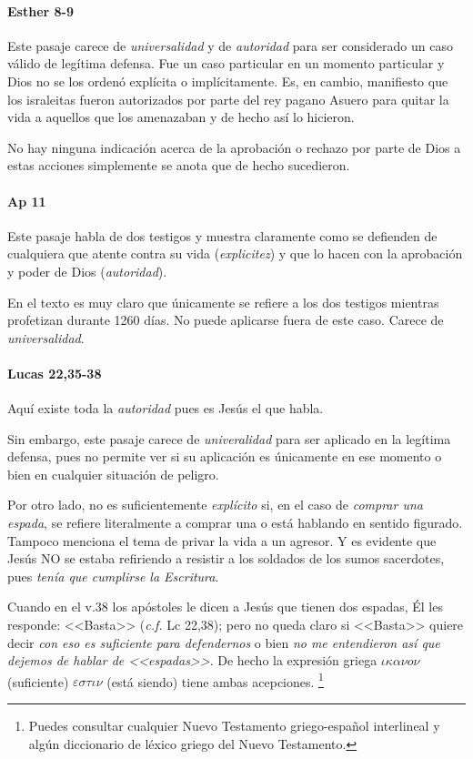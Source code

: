 \documentclass{article}
\begin{document}
\paragraph{Esther 8-9}

Este pasaje carece de \emph{universalidad} y de \emph{autoridad} para ser considerado un caso v\'alido de leg\'{i}tima defensa. Fue un caso particular en un momento particular y Dios no se los orden\'o expl\'{i}cita o impl\'{i}citamente. Es, en cambio, manifiesto que los israleitas fueron autorizados por parte del rey pagano Asuero para quitar la vida a aquellos que los amenazaban y de hecho as\'{i} lo hicieron.

No hay ninguna indicaci\'on acerca de la aprobaci\'on o rechazo por parte de Dios a estas acciones simplemente se anota que de hecho sucedieron.

\paragraph{Ap 11}

Este pasaje habla de dos testigos y muestra claramente como se defienden de cualquiera que atente contra su vida (\emph{explicitez}) y que lo hacen con la aprobaci\'on y poder de Dios (\emph{autoridad}).

En el texto es muy claro que \'unicamente se refiere a los dos testigos mientras profetizan durante 1260 d\'{i}as. No puede aplicarse fuera de este caso. Carece de \emph{universalidad}.

\paragraph{Lucas 22,35-38}

Aqu\'{i} existe toda la \emph{autoridad} pues es Jes\'us el que habla.

Sin embargo, este pasaje carece de \emph{univeralidad} para ser aplicado en la leg\'{i}tima defensa, pues no permite ver si su aplicaci\'on es \'unicamente en ese momento o bien en cualquier situaci\'on de peligro.

Por otro lado, no es suficientemente \emph{expl\'{i}cito} si, en el caso de \emph{comprar una espada}, se refiere literalmente a comprar una o est\'a hablando en sentido figurado. Tampoco menciona el tema de privar la vida a un agresor. Y es evidente que Jes\'us NO se estaba refiriendo a resistir a los soldados de los sumos sacerdotes, pues \emph{ten\'{i}a que cumplirse la Escritura}.

Cuando en el v.38 los ap\'ostoles le dicen a Jes\'us que tienen dos espadas, \'El les responde: <<Basta>> (\emph{c.f.} Lc 22,38); pero no queda claro si <<Basta>> quiere decir \emph{con eso es suficiente para defendernos} o bien \emph{no me entendieron as\'{i} que dejemos de hablar de <<espadas>>}. De hecho la expresi\'on griega $\iota\kappa\alpha\nu o \nu$ (suficiente) $\varepsilon\sigma\tau\iota\nu$ (est\'a siendo) tiene ambas acepciones.%
    \footnote{Puedes consultar cualquier Nuevo Testamento griego-espa\~nol interlineal y alg\'un diccionario de l\'exico griego del Nuevo Testamento.}
    
\end{document}
